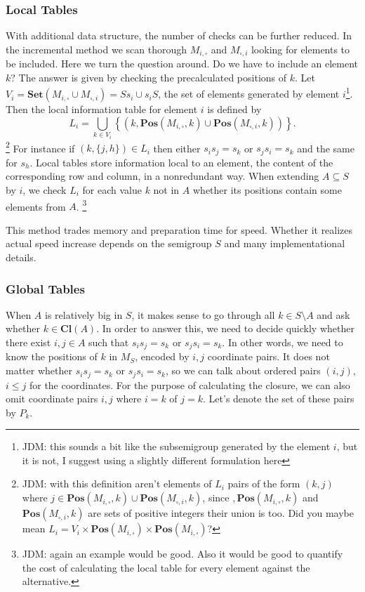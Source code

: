 \documentclass{amsart}
\newcommand{\Set}{\mathbf{Set}}
\newcommand{\Closure}{\mathbf{Cl}}
\newcommand{\Pos}{\mathbf{Pos}}
\theoremstyle{plain}
\theoremstyle{definition}
\begin{document}
\subsubsection{Local Tables}
With additional data structure, the number of checks can be further reduced. 
In the incremental method we scan thorough $M_{i,\square}$ and $M_{\square,i}$ looking for elements to be included.
Here we turn the question around.
Do we have to include an element $k$?
The answer is given by checking the precalculated positions of $k$. 
Let $V_i=\Set(M_{i,\square}\cup M_{\square,i})=Ss_i\cup s_iS$, the set of
elements generated by element $i$\footnote{JDM: this sounds a bit like the
subsemigroup generated by the element $i$, but it is not, I suggest using a
slightly different formulation here}.
Then the  local information table for element $i$ is defined by
$$L_i=\bigcup_{k\in
V_i}\left\{(k,\Pos(M_{i,\square},k)\cup\Pos(M_{\square,i},k))\right\}.$$
\footnote{JDM: with this definition aren't elements of $L_i$ pairs of the form 
  $(k, j)$ where $j\in \Pos(M_{i,\square},k)\cup\Pos(M_{\square,i},k)$, since
  $,\Pos(M_{i,\square},k)$ and $\Pos(M_{\square,i},k)$ are sets of positive
integers their union is too. Did you maybe mean
$L_i=V_i\times\Pos(M_{i,\square})\times \Pos(M_{i,\square})$?}
For instance if $(k,\{j,h\})\in L_i$ then either $s_is_j=s_k$ or $s_js_i=s_k$ and the same for $s_h$.
Local tables store information local to an element, the content of the corresponding row and column, in a nonredundant way.
When  extending $A\subseteq S$ by $i$, we check $L_i$ for each value $k$ not in
$A$ whether its positions contain some elements from $A$. \footnote{JDM: again
an example would be good. Also it would be good to quantify the cost of
calculating the local table for every element against the alternative.} 

This method trades memory and preparation time for speed. Whether it realizes actual speed increase depends on the semigroup $S$ and many implementational details.

\subsubsection{Global Tables}
When $A$ is relatively big in $S$, it makes sense to go through all $k\in S\setminus A$ and ask whether $k\in\Closure(A)$. 
In order to answer this, we need to decide quickly whether there exist $i,j\in A$ such that $s_is_j=s_k$ or $s_js_i=s_k$.
In other words, we need to know the positions of $k$ in $M_S$, encoded by $i,j$ coordinate pairs.
It does not matter whether $s_is_j=s_k$ or $s_js_i=s_k$, so we can talk about ordered pairs $(i,j)$, $i\leq j$ for the coordinates. 
For the purpose of calculating the closure, we can also omit coordinate pairs $i,j$ where $i=k$ of $j=k$. 
Let's denote the set of these pairs by $P_k$.
\end{document}
